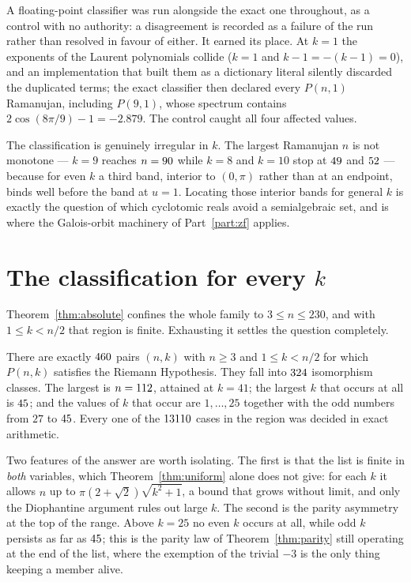 A floating-point classifier was run alongside the exact one throughout, as a
control with no authority: a disagreement is recorded as a failure of the run
rather than resolved in favour of either. It earned its place. At $k=1$ the
exponents of the Laurent polynomials collide ($k=1$ and $k-1=-(k-1)=0$), and an
implementation that built them as a dictionary literal silently discarded the
duplicated terms; the exact classifier then declared every $P(n,1)$ Ramanujan,
including $P(9,1)$, whose spectrum contains $2\cos(8\pi/9)-1=-2.879$. The
control caught all four affected values.

\begin{remark}
The classification is genuinely irregular in $k$. The largest Ramanujan $n$ is
not monotone --- $k=9$ reaches $n=90$ while $k=8$ and $k=10$ stop at
$49$ and $52$ --- because for even $k$ a third band, interior
to $(0,\pi)$ rather than at an endpoint, binds well before the band at $u=1$.
Locating those interior bands for general $k$ is exactly the question of which
cyclotomic reals avoid a semialgebraic set, and is where the Galois-orbit
machinery of Part~\ref{part:zf} applies.
\end{remark}

\section{The classification for every \texorpdfstring{$k$}{k}}\label{sec:allk}

Theorem~\ref{thm:absolute} confines the whole family to $3\le n\le230$, and
with $1\le k<n/2$ that region is finite. Exhausting it settles the question
completely.

\begin{theorem}\label{thm:allk}
There are exactly $460$ pairs $(n,k)$ with $n\ge3$ and $1\le k<n/2$
for which $P(n,k)$ satisfies the Riemann Hypothesis. They fall into
$324$ isomorphism classes. The largest is $n=112$, attained at
$k=41$; the largest $k$ that occurs at all is $45$; and the values of
$k$ that occur are $1,\dots,25$ together with the odd numbers from $27$ to
$45$. Every one of the $13110$ cases in the region was decided
in exact arithmetic.
\end{theorem}

Two features of the answer are worth isolating. The first is that the list is
finite in \emph{both} variables, which Theorem~\ref{thm:uniform} alone does not
give: for each $k$ it allows $n$ up to $\pi(2+\sqrt2)\sqrt{k^{2}+1}$, a bound
that grows without limit, and only the Diophantine argument rules out large
$k$. The second is the parity asymmetry at the top of the range. Above $k=25$
no even $k$ occurs at all, while odd $k$ persists as far as $45$; this
is the parity law of Theorem~\ref{thm:parity} still operating at the end of the
list, where the exemption of the trivial $-3$ is the only thing keeping a
member alive.

